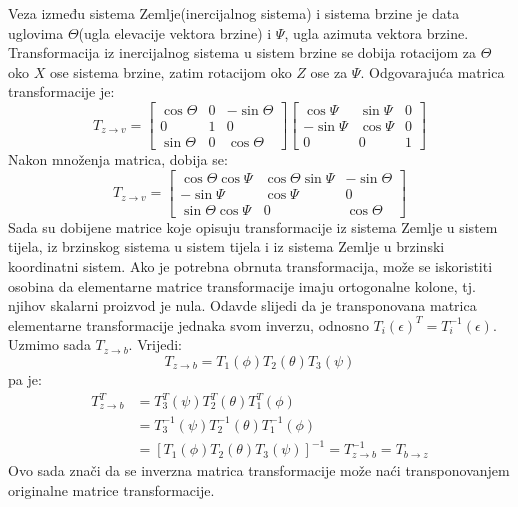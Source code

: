 Veza između sistema Zemlje(inercijalnog sistema) i sistema brzine je data uglovima $\Theta$(ugla elevacije vektora brzine)
i $\Psi$, ugla azimuta vektora brzine. Transformacija iz inercijalnog sistema u sistem brzine se dobija rotacijom 
za $\Theta$ oko $X$ ose sistema brzine, zatim rotacijom oko $Z$ ose za $\Psi$. Odgovarajuća matrica transformacije je:
\begin{equation}
    T_{z\to v} = \begin{bmatrix}
        \cos\Theta & 0 & -\sin\Theta \\
        0& 1& 0\\
        \sin\Theta & 0 & \cos\Theta
    \end{bmatrix}
    \begin{bmatrix}
        \cos\Psi & \sin\Psi & 0\\
        -\sin\Psi & \cos\Psi & 0\\
        0 & 0& 1
        \end{bmatrix}
\end{equation}
Nakon množenja matrica, dobija se:
\begin{equation}
    T_{z\to v} = \begin{bmatrix}
        \cos\Theta\cos\Psi & \cos\Theta\sin\Psi & -\sin\Theta \\
        -\sin\Psi & \cos\Psi & 0\\
        \sin\Theta\cos\Psi & 0 & \cos\Theta
    \end{bmatrix}
\end{equation}
Sada su dobijene matrice koje opisuju transformacije iz sistema Zemlje u sistem tijela, 
iz brzinskog sistema u sistem tijela i iz sistema Zemlje u brzinski koordinatni sistem. 
Ako je potrebna obrnuta transformacija, može se iskoristiti osobina da elementarne matrice transformacije 
imaju ortogonalne kolone, tj. njihov skalarni proizvod je nula. Odavde slijedi 
da je transponovana matrica elementarne transformacije jednaka svom inverzu, odnosno $T_i(\epsilon)^T = T_i^{-1}(\epsilon)$.
Uzmimo sada $T_{z \to b}$. Vrijedi:
\begin{equation*}
    T_{z \to b} = T_1(\phi)T_2(\theta)T_3(\psi)
\end{equation*}
pa je:
\begin{align*}    
    T_{z \to b}^T &= T_3^T(\psi)T_2^T(\theta)T_1^T(\phi)\\ & =  T_3^{-1}(\psi)T_2^{-1}(\theta)T_1^{-1}(\phi)\\
    & = [T_1(\phi)T_2(\theta)T_3(\psi)]^{-1} = T_{z \to b}^{-1} = T_{b\to z}
\end{align*}
Ovo sada znači da se inverzna matrica transformacije može naći transponovanjem originalne matrice 
transformacije. 
